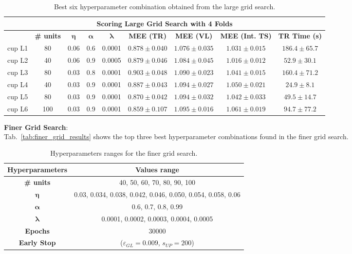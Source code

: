 \documentclass[11pt]{article}
\begin{document}
\begin{table}[H]
\small
    \centering
    \begin{tabular}{ |c|c|c|c|c|c|c|c|c|  }
     \hline
     \multicolumn{9}{|c|}{\textbf{Scoring Large Grid Search with 4 Folds }} \\
     \hline
      \hline
       \textbf{} & \textbf{\# units} & $\boldsymbol{\eta}$ & $\boldsymbol{\alpha}$ & $\boldsymbol{\lambda}$& \textbf{MEE (TR)} & \textbf{MEE (VL)} & \textbf{MEE (Int. TS)} & \textbf{TR Time (s)}\\
     \hline
    cup L1 & 80 & 0.06  & 0.6 & 0.0001 & $0.878 \pm 0.040$ & $1.076 \pm 0.035$ & $1.031 \pm 0.015$ & $186.4 \pm 65.7$ \\
    \hline
    cup L2 & 40 & 0.06  & 0.9 & 0.0005 & $0.879 \pm 0.046$ & $1.084 \pm 0.045$ & $1.016 \pm 0.012$ & $52.9 \pm 30.1$\\
    \hline
    cup L3 & 80 & 0.03  & 0.8 & 0.0001 & $0.903 \pm 0.048$ & $1.090 \pm 0.023$ & $1.041 \pm 0.015$ & $160.4 \pm 71.2$\\
    \hline
    cup L4 & 40 & 0.03  & 0.9 & 0.0001 & $0.887 \pm 0.043$ & $1.094 \pm 0.027$ & $1.050 \pm 0.021$ & $24.9 \pm 8.1$\\
    \hline
    cup L5 & 80 & 0.03  & 0.9 & 0.0001 & $0.870 \pm 0.042$ & $1.094 \pm 0.032$ & $1.042 \pm 0.033$ & $49.5 \pm 14.7$\\
    \hline
    cup L6 & 100 & 0.03 & 0.9 & 0.0001 & $0.859 \pm 0.107$ & $1.095 \pm 0.016$ & $1.061 \pm 0.019$ & $94.7 \pm 77.2$\\
     \hline
    \end{tabular}
    \caption{Best six hyperparameter combination obtained from the large grid search.}
    \label{tab:large_grid_result}
\end{table}

\noindent\textbf{Finer Grid Search}:\\
Tab.~\ref{tab:finer_grid_results} shows the top three best hyperparameter combinations found in the finer grid search.

\begin{table}[H]
\small
    \centering
    \begin{tabular}{ |c|c| }
        \hline
        \textbf{Hyperparameters} & \textbf{Values range}\\
        \hline
        \hline
        \textbf{\# units} & 40, 50, 60, 70, 80, 90, 100\\
        \hline
         $\boldsymbol{\eta}$ & 0.03, 0.034, 0.038, 0.042, 0.046, 0.050, 0.054, 0.058, 0.06\\
        \hline
        $\boldsymbol{\alpha}$ & 0.6, 0.7, 0.8, 0.99\\
        \hline
        $\boldsymbol{\lambda}$ & 0.0001, 0.0002, 0.0003, 0.0004, 0.0005\\
        \hline
        \textbf{Epochs} & 30000\\
        \hline
        \textbf{Early Stop} & ($\varepsilon_{GL} = 0.009$, $s_{UP} = 200$)\\
        \hline
    \end{tabular}
    \caption{Hyperparameters ranges for the finer grid search.}
    \label{tab:finer_grid}
\end{table}
\end{document}
